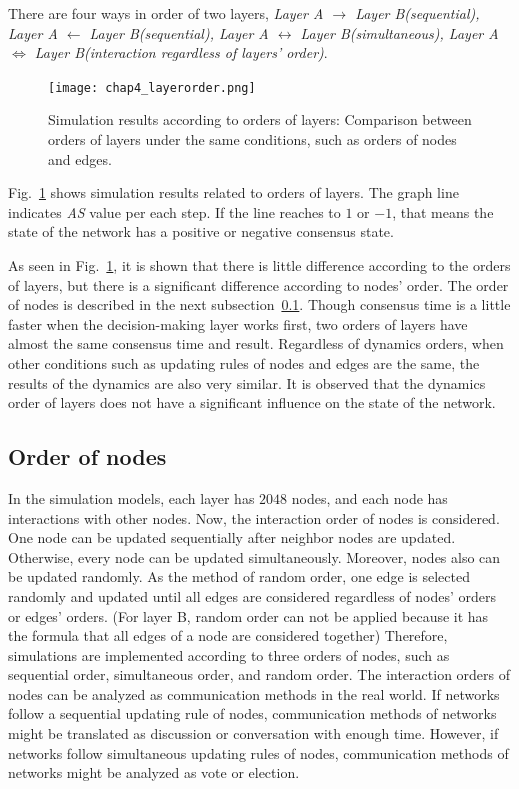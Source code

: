 There are four ways in order of two layers, \textit{Layer A $\to$ Layer B(sequential), Layer A $\leftarrow$ Layer B(sequential), Layer A $\leftrightarrow$ Layer B(simultaneous), Layer A $\Leftrightarrow$ Layer B(interaction regardless of layers' order)}. 

\begin{figure}[!htb]
	\centering
	\texttt{[image: chap4\_layerorder.png]}
	\caption{Simulation results according to orders of layers: Comparison between orders of layers under the same conditions, such as orders of nodes and edges.}
	\label{chap4_layerorder}
\end{figure}

Fig.~\ref{chap4_layerorder} shows simulation results related to orders of layers. The graph line indicates \textit{AS} value per each step. If the line reaches to $1$ or $-1$, that means the state of the network has a positive or negative consensus state.

As seen in Fig.~\ref{chap4_layerorder}, it is shown that there is little difference according to the orders of layers, but there is a significant difference according to nodes' order. The order of nodes is described in the next subsection~\ref{order of node}. Though consensus time is a little faster when the decision-making layer works first, two orders of layers have almost the same consensus time and result. Regardless of dynamics orders, when other conditions such as updating rules of nodes and edges are the same, the results of the dynamics are also very similar. It is observed that the dynamics order of layers does not have a significant influence on the state of the network. \\

\subsection{Order of nodes}
\label{order of node}
In the simulation models, each layer has $2048$ nodes, and each node has interactions with other nodes. Now, the interaction order of nodes is considered. One node can be updated sequentially after neighbor nodes are updated. Otherwise, every node can be updated simultaneously. Moreover, nodes also can be updated randomly. As the method of random order, one edge is selected randomly and updated until all edges are considered regardless of nodes' orders or edges' orders. (For layer B, random order can not be applied because it has the formula that all edges of a node are considered together) Therefore, simulations are implemented according to three orders of nodes, such as sequential order, simultaneous order, and random order. The interaction orders of nodes can be analyzed as communication methods in the real world. If networks follow a sequential updating rule of nodes, communication methods of networks might be translated as discussion or conversation with enough time. However, if networks follow simultaneous updating rules of nodes, communication methods of networks might be analyzed as vote or election.

